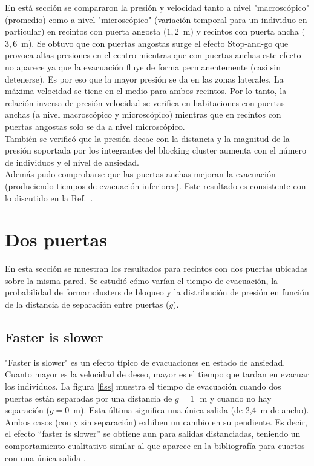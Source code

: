 En está sección se compararon la presión y velocidad tanto a nivel "macroscópico" (promedio) como a nivel "microscópico" (variación temporal para un individuo en particular) en recintos con puerta angosta ($1,2$~m) y recintos con puerta ancha ($3,6$~m). Se obtuvo que con puertas angostas surge el efecto Stop-and-go que provoca altas presiones en el centro mientras que con puertas anchas este efecto no aparece ya que la evacuación fluye de forma permanentemente (casi sin detenerse). Es por eso que la mayor presión se da en las zonas laterales. La máxima velocidad se tiene en el medio para ambos recintos. Por lo tanto, la relación inversa de presión-velocidad se verifica en habitaciones con puertas anchas (a nivel macroscópico y microscópico) mientras que en recintos con puertas angostas solo se da a nivel microscópico.\\

También se verificó que la presión decae con la distancia y la magnitud de la presión soportada por los integrantes del blocking cluster aumenta con el número de individuos y el nivel de ansiedad.\\
Además pudo comprobarse que las puertas anchas mejoran la evacuación (produciendo tiempos de evacuación inferiores). Este resultado es consistente con lo discutido en la Ref.~\cite{huanhuan1}.  

\newpage

\section{\label{dos_puertas} Dos puertas}

En esta sección se muestran los resultados para recintos con dos puertas ubicadas sobre la misma pared. Se estudió cómo varían el tiempo de evacuación, la probabilidad de formar clusters de bloqueo y la distribución de presión en función de la distancia de separación entre puertas ($g$).  

\subsection{Faster is slower}

"Faster is slower" es un efecto típico de evacuaciones en estado de ansiedad. Cuanto mayor es la velocidad de deseo, mayor es el tiempo que tardan en evacuar los individuos. 
La figura \ref{fiss} muestra el tiempo de evacuación cuando dos puertas están separadas por una distancia de $g=1\,$~m 
y cuando no hay separación ($g=0$~m). Esta última significa una única salida (de 2,4~m de ancho). Ambos casos (con y sin separación) exhiben un cambio en su pendiente. Es decir, el efecto ``faster is slower'' se obtiene aun para salidas distanciadas, teniendo un comportamiento cualitativo similar al que aparece en la bibliografía para cuartos con una única salida \cite{Helbing1,Dorso1}.\\ 

